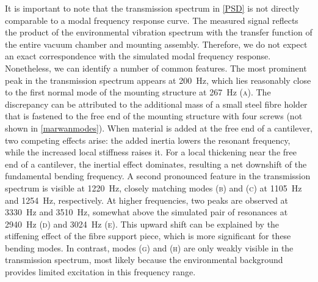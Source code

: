 \documentclass[../Thesis-IJspeert.tex]{subfiles}
\begin{document}
It is important to note that the transmission spectrum in \autoref{PSD} is not directly comparable to a modal frequency response curve. The measured signal reflects the product of the environmental vibration spectrum with the transfer function of the entire vacuum chamber and mounting assembly. Therefore, we do not expect an exact correspondence with the simulated modal frequency response. Nonetheless, we can identify a number of common features. The most prominent peak in the transmission spectrum appears at \SI{200}{\hertz}, which lies reasonably close to the first normal mode of the mounting structure at \SI{267}{\hertz} \textsc{(a)}. The discrepancy can be attributed to the additional mass of a small steel fibre holder that is fastened to the free end of the mounting structure with four screws (not shown in \autoref{marwanmodes}). When material is added at the free end of a cantilever, two competing effects arise: the added inertia lowers the resonant frequency, while the increased local stiffness raises it. For a local thickening near the free end of a cantilever, the inertial effect dominates, resulting a net downshift of the fundamental bending frequency. A second pronounced feature in the transmission spectrum is visible at \SI{1220}{\hertz}, closely matching modes \textsc{(b)} and \textsc{(c)} at \SI{1105}{\hertz} and \SI{1254}{\hertz}, respectively. At higher frequencies, two peaks are observed at \SI{3330}{\hertz} and \SI{3510}{\hertz}, somewhat above the simulated pair of resonances at \SI{2940}{\hertz} \textsc{(d)} and \SI{3024}{\hertz} \textsc{(e)}. This upward shift can be explained by the stiffening effect of the fibre support piece, which is more significant for these bending modes. In contrast, modes \textsc{(g)} and \textsc{(h)} are only weakly visible in the transmission spectrum, most likely because the environmental background provides limited excitation in this frequency range.
\end{document}
